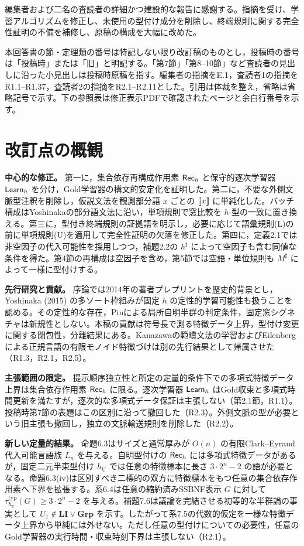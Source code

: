 
編集者および二名の査読者の詳細かつ建設的な報告に感謝する。指摘を受け、学習アルゴリズムを修正し、未使用の型付け成分を削除し、終端規則に関する完全性証明の不備を補修し、原稿の構成を大幅に改めた。

本回答書の節・定理類の番号は特記しない限り改訂稿のものとし，投稿時の番号は「投稿時」または「旧」と明記する。「第7節」「第8--10節」など査読者の見出しに沿った小見出しは投稿時原稿を指す。編集者の指摘をE.1，査読者1の指摘をR1.1--R1.37，査読者2の指摘をR2.1--R2.11とした。引用は体裁を整え，省略は省略記号で示す。下の参照表は修正表示PDFで確認されたページと余白行番号を示す。

\section*{改訂点の概観}
\noindent\textbf{中心的な修正。}
第一に，集合依存再構成作用素 $\mathsf{Rec}_h$ と保守的逐次学習器 $\mathsf{Learn}_h$ を分け，Gold学習器の構文的安定化を証明した。第二に，不要な外側文脈型注釈を削除し，仮説文法を観測部分語 $x$ ごとの $\llbracket x\rrbracket$ に単純化した。バッチ構成はYoshinakaの部分語文法に沿い，単項規則で窓比較を $h$-型の一致に置き換える。第三に，型付き終端規則の証拠語を明示し，必要に応じて語彙規則(L)の前に単項規則(U)を適用して完全性証明の欠落を修正した。第四に，定義2.1では非空因子の代入可能性を採用しつつ，補題2.2の $h^\sharp$ によって空因子も含む同値な条件を得た。第4節の再構成は空因子を含め，第5節では空語・単位規則も $M^\sharp$ によって一様に型付けする。

\noindent\textbf{先行研究と貢献。}
序論では2014年の著者プレプリントを歴史的背景とし，Yoshinaka (2015) の多ソート枠組みが固定 $h$ の定性的学習可能性も扱うことを認める。その定性的な存在，Pinによる局所自明半群の判定条件，固定窓シグネチャは新規性としない。本稿の貢献は符号長で測る特徴データ上界，型付け変更に関する閉包性，分離結果にある。Kanazawaの範疇文法の学習およびEilenbergによる正規言語の有限モノイド特徴づけは別の先行結果として帰属させた（R1.3，R2.1，R2.5）。

\noindent\textbf{主張範囲の限定。}
提示順序独立性と所定の定量的条件下での多項式特徴データ上界は集合依存作用素 $\mathsf{Rec}_h$ に限る。逐次学習器 $\mathsf{Learn}_h$ はGold収束と多項式時間更新を満たすが，逐次的な多項式データ保証は主張しない（第2.1節，R1.1）。投稿時第7節の表題はこの区別に沿って撤回した（R2.3）。外側文脈の型が必要という旧主張も撤回し，独立の文脈輸送規則を削除した（R2.2）。

\noindent\textbf{新しい定量的結果。}
命題6.3はサイズと通常厚みが $O(n)$ の有限Clark--Eyraud代入可能言語族 $L_n$ を与える。自明型付けの $\mathsf{Rec}_h$ には多項式特徴データがあるが，固定二元半束型付け $h_{\mathrm U}$ では任意の特徴標本に長さ $3\cdot2^n-2$ の語が必要となる。命題6.3(iv)は区別すべき二標的の双方に特徴標本をもつ任意の集合依存作用素へ下界を拡張する。系6.4は任意の縮約済みSSBNF表示 $G$ に対して $\tau_{h_{\mathrm U}}^{\mathrm{typ}}(G)\ge3\cdot2^n-2$ を与える。補題7.6は議論を完結させる初等的な半群論の事実として $U_1\notin\mathbf{LI}\vee\mathbf{Grp}$ を示す。したがって系7.5の代数的仮定を一様な特徴データ上界から単純には外せない。ただし任意の型付けについての必要性，任意のGold学習器の実行時間・収束時刻下界は主張しない（R2.1）。


